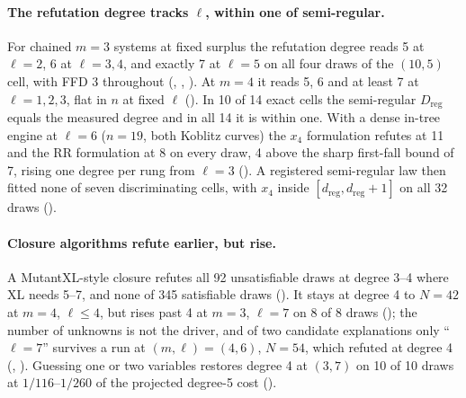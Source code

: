 \paragraph{The refutation degree tracks $\ell$, within one of semi-regular.}
For chained $m=3$ systems at fixed surplus the refutation degree reads 5 at
$\ell=2$, 6 at $\ell=3,4$, and exactly 7 at $\ell=5$ on all four draws of
the $(10,5)$ cell, with FFD 3 throughout
(,
,
). At $m=4$ it reads 5, 6 and at
least 7 at $\ell=1,2,3$, flat in $n$ at fixed $\ell$
(). In 10 of 14 exact cells the
semi-regular $D_{\mathrm{reg}}$ equals the measured degree and in all 14 it
is within one. With a dense in-tree engine at $\ell=6$ ($n=19$, both
Koblitz curves) the $x_4$ formulation refutes at 11 and the RR formulation at
8 on every draw, 4 above the sharp first-fall bound of 7, rising one degree
per rung from $\ell=3$ (). A
registered semi-regular law then fitted none of seven discriminating cells,
with $x_4$ inside $[d_{\mathrm{reg}},d_{\mathrm{reg}}+1]$ on all 32 draws
().

\paragraph{Closure algorithms refute earlier, but rise.} A MutantXL-style
closure refutes all 92 unsatisfiable draws at degree 3--4 where XL needs
5--7, and none of 345 satisfiable draws
(). It stays at degree 4 to
$N=42$ at $m=4$, $\ell\le4$, but rises past 4 at $m=3$, $\ell=7$ on 8 of 8
draws (); the number of unknowns
is not the driver, and of two candidate explanations only ``$\ell=7$''
survives a run at $(m,\ell)=(4,6)$, $N=54$, which refuted at degree 4
(,
). Guessing one or two variables
restores degree 4 at $(3,7)$ on 10 of 10 draws at $1/116$--$1/260$ of the
projected degree-5 cost ().

